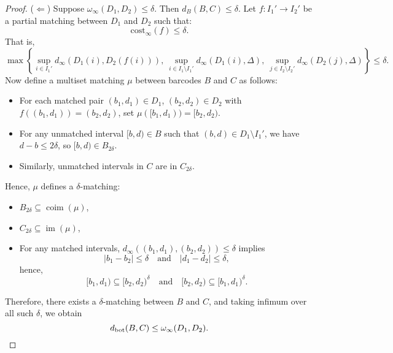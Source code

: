 \begin{proof}
    ($\Leftarrow$) Suppose $\omega_\infty(D_1, D_2) \leq \delta$. Then $d_B(B, C) \leq \delta$. Let $f: I_1' \to I_2'$ be a partial matching between $D_1$ and $D_2$ such that:
    \begin{equation}
        \mathrm{cost}_\infty(f) \leq \delta.
    \end{equation}
    That is,
    \begin{equation}
        \max\left\{ \sup_{i \in I_1'} d_\infty(D_1(i), D_2(f(i))),\ 
        \sup_{i \in I_1 \setminus I_1'} d_\infty(D_1(i), \Delta),\ 
        \sup_{j \in I_2 \setminus I_2'} d_\infty(D_2(j), \Delta) \right\} \leq \delta.
    \end{equation}
    Now define a multiset matching $\mu$ between barcodes $B$ and $C$ as follows:
    \begin{itemize}
    \item For each matched pair $(b_1,d_1) \in D_1$, $(b_2,d_2) \in D_2$ with $f((b_1,d_1)) = (b_2,d_2)$, set $\mu([b_1,d_1)) = [b_2,d_2)$.
    \item For any unmatched interval $[b,d) \in B$ such that $(b,d) \in D_1 \setminus I_1'$, we have $d - b \leq 2\delta$, so $[b,d) \in B_{2\delta}$.
    \item Similarly, unmatched intervals in $C$ are in $C_{2\delta}$.
    \end{itemize}
    Hence, $\mu$ defines a $\delta$-matching:
    \begin{itemize}
    \item $B_{2\delta} \subseteq \operatorname{coim}(\mu)$,
    \item $C_{2\delta} \subseteq \operatorname{im}(\mu)$,
    \item For any matched intervals, $d_\infty((b_1,d_1), (b_2,d_2)) \leq \delta$ implies
    \begin{equation}
    |b_1 - b_2| \leq \delta \quad \text{and} \quad |d_1 - d_2| \leq \delta,
    \end{equation}
    hence,
    \begin{equation}
    [b_1,d_1) \subseteq [b_2,d_2)^\delta \quad \text{and} \quad [b_2,d_2) \subseteq [b_1,d_1)^\delta.
    \end{equation}
    \end{itemize}
    Therefore, there exists a $\delta$-matching between $B$ and $C$, and taking infimum over all such $\delta$, we obtain
    \begin{equation}
        d_{\operatorname{bot}}(B, C) \leq \omega_\infty(D_1, D_2).
    \end{equation}
\end{proof}


